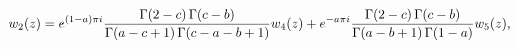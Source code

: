 \[w_{2}(z)=e^{(1-a)\pi i}\frac{\mathop{\Gamma\/}\nolimits\!\left(2-c\right)%
\mathop{\Gamma\/}\nolimits\!\left(c-b\right)}{\mathop{\Gamma\/}\nolimits\!%
\left(a-c+1\right)\mathop{\Gamma\/}\nolimits\!\left(c-a-b+1\right)}w_{4}(z)+e^%
{-a\pi i}\frac{\mathop{\Gamma\/}\nolimits\!\left(2-c\right)\mathop{\Gamma\/}%
\nolimits\!\left(c-b\right)}{\mathop{\Gamma\/}\nolimits\!\left(a-b+1\right)%
\mathop{\Gamma\/}\nolimits\!\left(1-a\right)}w_{5}(z),\]
